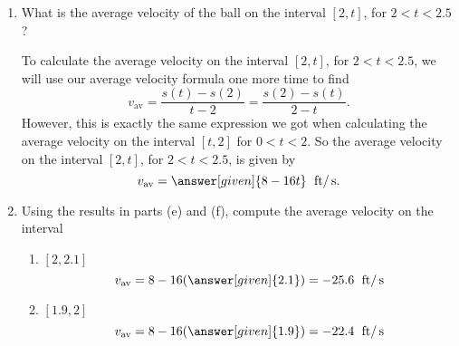 \documentclass{ximera}
\begin{document}
\begin{example}
\begin{enumerate}
\begin{explanation}
\begin{image}
\end{image}
\end{explanation}


\item What is the average velocity of the ball on the interval $[2,t]$, for
$2<t<2.5$?

\begin{explanation}

To calculate the average velocity on the interval $[2,t]$, for 
$2<t<2.5$, we will use our average velocity formula one more time
to find
\[
v_{\text{av}} = \frac{s(t)-s(2)}{t-2} = \frac{s(2)-s(t)}{2-t}. 
\]
However, this is exactly the same expression we got when calculating
the average velocity on the interval $[t,2]$ for $0<t<2$.  So the 
average velocity on the interval $[2,t]$, for $2<t<2.5$, is given by
\[
v_{\text{av}} =\answer[given]{8-16t}\hspace{0.06in}\unit{ft}/\unit{s}.
\]
\end{explanation}
\item Using the results in parts (e) and (f), compute the average velocity on the interval
\begin{enumerate}
\item $[2, 2.1]$
\[
v_{\text{av}} =  8-16(\answer[given]{2.1})=-25.6 \hspace{0.06in}\unit{ft}/\unit{s}
\]
\item $[1.9,2]$
\[
v_{\text{av}} =  8-16(\answer[given]{1.9})=-22.4 \hspace{0.06in}\unit{ft}/\unit{s}
\]
\end{enumerate}
\end{enumerate}
\end{example}
\end{document}
